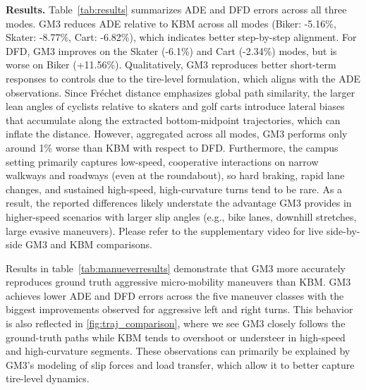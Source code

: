 \documentclass[letterpaper, 10 pt, conference]{ieeeconf}  %
\begin{document}
\textbf{Results.}
Table~\ref{tab:results} summarizes ADE and DFD errors across all three modes. GM3 reduces ADE relative to KBM across all modes (Biker: -5.16\%, Skater: -8.77\%, Cart: -6.82\%), which indicates better step-by-step alignment. For DFD, GM3 improves on the Skater (-6.1\%) and Cart (-2.34\%) modes, but is worse on Biker (+11.56\%). Qualitatively, GM3 reproduces better short-term responses to controls due to the tire-level formulation, which aligns with the ADE observations. Since Fréchet distance emphasizes global path similarity, the larger lean angles of cyclists relative to skaters and golf carts introduce lateral biases that accumulate along the extracted bottom-midpoint trajectories, which can inflate the distance. However, aggregated across all modes, GM3 performs only around 1\% worse than KBM with respect to DFD. Furthermore, the campus setting primarily captures low-speed, cooperative interactions on narrow walkways and roadways (even at the roundabout), so hard braking, rapid lane changes, and sustained high-speed, high-curvature turns tend to be rare. As a result, the reported differences likely understate the advantage GM3 provides in higher-speed scenarios with larger slip angles (e.g., bike lanes, downhill stretches, large evasive maneuvers). Please refer to the supplementary video for live side-by-side GM3 and KBM comparisons. 

Results in table~\ref{tab:manueverresults} demonstrate that GM3 more accurately reproduces ground truth aggressive micro-mobility maneuvers than KBM. GM3 achieves lower ADE and DFD errors across the five maneuver classes with the biggest improvements observed for aggressive left and right turns. This behavior is also reflected in \ref{fig:traj_comparison}, where we see GM3 closely follows the ground-truth paths while KBM tends to overshoot or understeer in high-speed and high-curvature segments. These observations can primarily be explained by GM3's modeling of slip forces and load transfer, which allow it to better capture tire-level dynamics.
\end{document}

